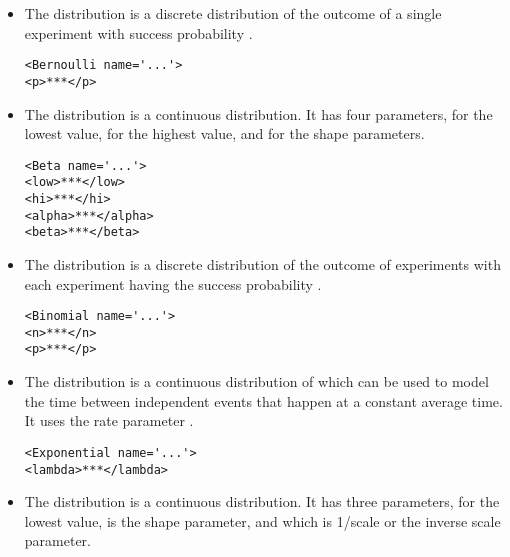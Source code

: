 \begin{itemize}


\item The  distribution is a discrete distribution of
the outcome of a single experiment with success probability
.
\begin{lstlisting}[style=XML]
<Bernoulli name='...'>
<p>***</p>
\end{lstlisting}

\item The  distribution is a continuous distribution.  It has
four parameters,  for the lowest value,
 for the highest value,  and
 for the shape parameters.

\begin{lstlisting}[style=XML]
<Beta name='...'>
<low>***</low>
<hi>***</hi>
<alpha>***</alpha>
<beta>***</beta>
\end{lstlisting}

\item The  distribution is a discrete distribution of the
outcome of  experiments with each experiment having the
success probability .

\begin{lstlisting}[style=XML]
<Binomial name='...'>
<n>***</n>
<p>***</p>
\end{lstlisting}


\item The  distribution is a continuous distribution
of which can be used to model the time between independent events that
happen at a constant average time.  It uses the rate parameter
.

\begin{lstlisting}[style=XML]
<Exponential name='...'>
<lambda>***</lambda>
\end{lstlisting}


\item The  distribution is a continuous distribution.  It
has three parameters,  for the lowest value,
 is the shape parameter, and  which
is 1/scale or the inverse scale parameter.


\end{itemize}
